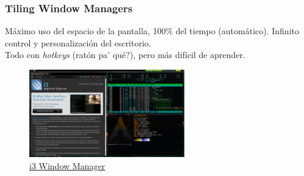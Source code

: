 \documentclass[aspectratio=43]{beamer}
\begin{document}
\begin{frame}
    \frametitle{Tiling Window Managers}
    Máximo uso del espacio de la pantalla, 100\% del tiempo (automático). Infinito control y personalización del escritorio.\\
    Todo con \textit{hotkeys} (ratón pa' qué?), pero más difícil de aprender.

    \begin{figure}
        \centering
        \includegraphics[width=0.6\textwidth]{img/i3_window_manager.png}
        \caption{\href{https://i3wm.org/}{i3 Window Manager}}
    \end{figure}
\end{frame}
\end{document}
